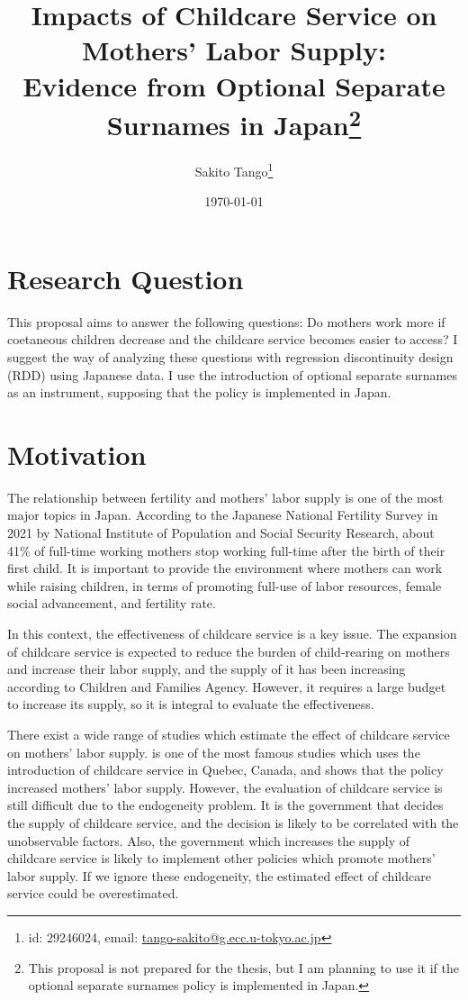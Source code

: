 \documentclass[12pt]{article}
\title{Impacts of Childcare Service on Mothers' Labor Supply: \\ 
       Evidence from Optional Separate Surnames in Japan\thanks{
        This proposal is not prepared for the thesis, but I am planning to use it if the optional separate surnames policy is implemented in Japan.
       }
       }
\author{Sakito Tango\thanks{id: 29246024, 
        email: \href{mailto:tango-sakito@g.ecc.u-tokyo.ac.jp}{tango-sakito@g.ecc.u-tokyo.ac.jp}
}
}
\date{\today}
\begin{document}
\maketitle

\section{Research Question}
This proposal aims to answer the following questions: Do mothers work more if coetaneous children decrease and the childcare service becomes easier to access?   
I suggest the way of analyzing these questions with regression discontinuity design (RDD) using Japanese data. 
I use the introduction of optional separate surnames as an instrument, supposing that the policy is implemented in Japan.


\section{Motivation}
The relationship between fertility and mothers' labor supply is one of the most major topics in Japan. 
According to the Japanese National Fertility Survey in 2021 by National Institute of Population and Social Security Research, about 41\% of full-time working mothers stop working full-time after the birth of their first child.
It is important to provide the environment where mothers can work while raising children, in terms of promoting full-use of labor resources, female social advancement, and fertility rate.


In this context, the effectiveness of childcare service is a key issue. 
The expansion of childcare service is expected to reduce the burden of child-rearing on mothers and increase their labor supply, and the supply of it has been increasing according to Children and Families Agency. 
However, it requires a large budget to increase its supply, so it is integral to evaluate the effectiveness.


There exist a wide range of studies which estimate the effect of childcare service on mothers' labor supply.
\cite{Baker2008-vt} is one of the most famous studies which uses the introduction of childcare service in Quebec, Canada, and shows that the policy increased mothers' labor supply.
However, the evaluation of childcare service is still difficult due to the endogeneity problem. 
It is the government that decides the supply of childcare service, and the decision is likely to be correlated with the unobservable factors. 
Also, the government which increases the supply of childcare service is likely to implement other policies which promote mothers' labor supply.
If we ignore these endogeneity, the estimated effect of childcare service could be overestimated.
\end{document}
